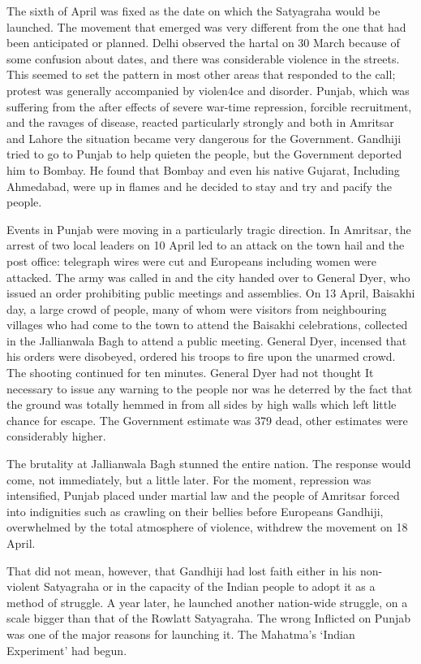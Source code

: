 The sixth of April was fixed as the date on which the Satyagraha would be launched. The movement that emerged was very different from the one that had been anticipated or planned. Delhi observed the hartal on 30 March because of some confusion about dates, and there was considerable violence in the streets. This seemed to set the pattern in most other areas that responded to the call; protest was generally accompanied by violen4ce and disorder. Punjab, which was suffering from the after effects of severe war-time repression, forcible recruitment, and the ravages of disease, reacted particularly strongly and both in Amritsar and Lahore the situation became very dangerous for the Government. Gandhiji tried to go to Punjab to help quieten the people, but the Government deported him to Bombay. He found that Bombay and even his native Gujarat, Including Ahmedabad, were up in flames and he decided to stay and try and pacify the people.

Events in Punjab were moving in a particularly tragic direction. In Amritsar, the arrest of two local leaders on 10 April led to an attack on the town hail and the post office: telegraph wires were cut and Europeans including women were attacked. The army was called in and the city handed over to General Dyer, who issued an order prohibiting public meetings and assemblies. On 13 April, Baisakhi day, a large crowd of people, many of whom were visitors from neighbouring villages who had come to the town to attend the Baisakhi celebrations, collected in the Jallianwala Bagh to attend a public meeting. General Dyer, incensed that his orders were disobeyed, ordered his troops to fire upon the unarmed crowd. The shooting continued for ten minutes. General Dyer had not thought It necessary to issue any warning to the people nor was he deterred by the fact that the ground was totally hemmed in from all sides by high walls which left little chance for escape. The Government estimate was 379 dead, other estimates were considerably higher.

The brutality at Jallianwala Bagh stunned the entire nation. The response would come, not immediately, but a little later. For the moment, repression was intensified, Punjab placed under martial law and the people of Amritsar forced into indignities such as crawling on their bellies before Europeans Gandhiji, overwhelmed by the total atmosphere of violence, withdrew the movement on 18 April.

That did not mean, however, that Gandhiji had lost faith either in his non-violent Satyagraha or in the capacity of the Indian people to adopt it as a method of struggle. A year later, he launched another nation-wide struggle, on a scale bigger than that of the Rowlatt Satyagraha. The wrong Inflicted on Punjab was one of the major reasons for launching it. The Mahatma's `Indian Experiment' had begun.

